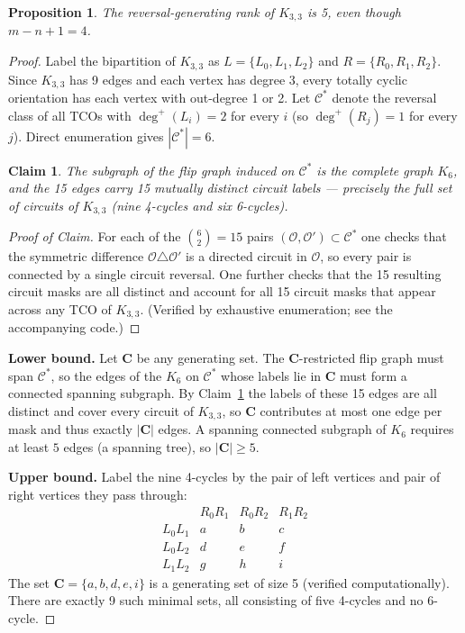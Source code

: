 \documentclass[12p]{amsart}
\numberwithin{equation}{section}
\theoremstyle{plain}
\newtheorem{prop}[thm]{Proposition}
\newtheorem{claim}[thm]{Claim}
\theoremstyle{definition}
\begin{document}
\begin{prop}
    The reversal-generating rank of $K_{3,3}$ is 5, even though $m-n+1 = 4$.
\end{prop}
\begin{proof}
Label the bipartition of $K_{3,3}$ as $L = \{L_0, L_1, L_2\}$ and $R = \{R_0, R_1, R_2\}$.
Since $K_{3,3}$ has 9 edges and each vertex has degree 3, every totally cyclic orientation has each vertex with out-degree 1 or 2.
Let $\mathcal{C}^*$ denote the reversal class of all TCOs with $\deg^+(L_i) = 2$ for every $i$ (so $\deg^+(R_j) = 1$ for every $j$).
Direct enumeration gives $|\mathcal{C}^*| = 6$.

\begin{claim}\label{claim:K6}
The subgraph of the flip graph induced on $\mathcal{C}^*$ is the complete graph $K_6$, and the 15 edges carry 15 mutually distinct circuit labels --- precisely the full set of circuits of $K_{3,3}$ (nine 4-cycles and six 6-cycles).
\end{claim}

\begin{proof}[Proof of Claim]
For each of the $\binom{6}{2} = 15$ pairs $(\mathcal{O}, \mathcal{O}') \subset \mathcal{C}^*$ one checks that the symmetric difference $\mathcal{O} \triangle \mathcal{O}'$ is a directed circuit in $\mathcal{O}$, so every pair is connected by a single circuit reversal.
One further checks that the 15 resulting circuit masks are all distinct and account for all 15 circuit masks that appear across any TCO of $K_{3,3}$. (Verified by exhaustive enumeration; see the accompanying code.)
\end{proof}

\noindent\textbf{Lower bound.} Let $\mathbf{C}$ be any generating set. The $\mathbf{C}$-restricted flip graph must span $\mathcal{C}^*$, so the edges of the $K_6$ on $\mathcal{C}^*$ whose labels lie in $\mathbf{C}$ must form a connected spanning subgraph. By Claim~\ref{claim:K6} the labels of these 15 edges are all distinct and cover every circuit of $K_{3,3}$, so $\mathbf{C}$ contributes at most one edge per mask and thus exactly $|\mathbf{C}|$ edges. A spanning connected subgraph of $K_6$ requires at least $5$ edges (a spanning tree), so $|\mathbf{C}| \geq 5$.

\noindent\textbf{Upper bound.} Label the nine 4-cycles by the pair of left vertices and pair of right vertices they pass through:
\[
\begin{array}{c|ccc}
& R_0 R_1 & R_0 R_2 & R_1 R_2 \\ \hline
L_0 L_1 & a & b & c \\
L_0 L_2 & d & e & f \\
L_1 L_2 & g & h & i
\end{array}
\]
The set $\mathbf{C} = \{a, b, d, e, i\}$ is a generating set of size 5 (verified computationally). There are exactly 9 such minimal sets, all consisting of five 4-cycles and no 6-cycle.
\end{proof}
\end{document}
